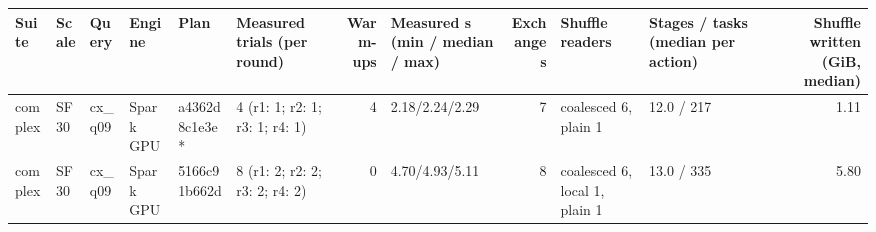 \begin{longtable}{llllllrlrllr}
\toprule
Suite & Scale & Query & Engine & Plan & Measured trials (per round) & Warm-ups & Measured s (min / median / max) & Exchanges & Shuffle readers & Stages / tasks (median per action) & Shuffle written (GiB, median) \\
\midrule
\endhead
\bottomrule
\endfoot
complex & SF30 & cx\_q09 & Spark GPU & a4362d8c1e3e * & 4 (r1: 1; r2: 1; r3: 1; r4: 1) & 4 & 2.18/2.24/2.29 & 7 & coalesced 6, plain 1 & 12.0 / 217 & 1.11 \\
complex & SF30 & cx\_q09 & Spark GPU & 5166c91b662d & 8 (r1: 2; r2: 2; r3: 2; r4: 2) & 0 & 4.70/4.93/5.11 & 8 & coalesced 6, local 1, plain 1 & 13.0 / 335 & 5.80 \\
\end{longtable}
